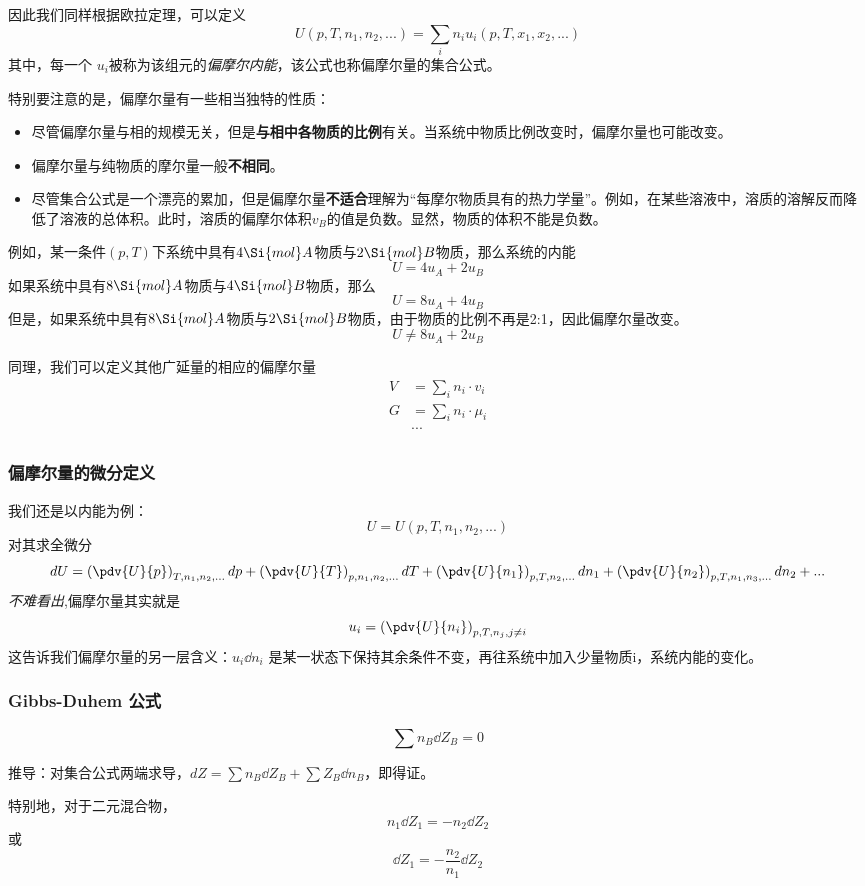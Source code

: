 因此我们同样根据欧拉定理，可以定义
$$ U (p, T, n_1, n_2, ...) = \sum_i n_i u_i(p, T, x_1, x_2, ...) $$
其中，每一个 $u_i$被称为该组元的\textsl{偏摩尔内能}，该公式也称偏摩尔量的集合公式。

特别要注意的是，偏摩尔量有一些相当独特的性质：
\begin{itemize}
\item 尽管偏摩尔量与相的规模无关，但是\textbf{与相中各物质的比例}有关。当系统中物质比例改变时，偏摩尔量也可能改变。
\item 偏摩尔量与纯物质的摩尔量一般\textbf{不相同}。
\item 尽管集合公式是一个漂亮的累加，但是偏摩尔量\textbf{不适合}理解为“每摩尔物质具有的热力学量”。例如，在某些溶液中，溶质的溶解反而降低了溶液的总体积。此时，溶质的偏摩尔体积$v_B$的值是负数。显然，物质的体积不能是负数。
\end{itemize}

\begin{example}{}
例如，某一条件$(p,T)$下系统中具有$4 \Si{mol} A$物质与$2 \Si{mol} B$物质，那么系统的内能
$$U = 4 u_{A} +  2 u_B $$
如果系统中具有$8 \Si{mol} A$物质与$4 \Si{mol} B$物质，那么
$$U = 8 u_A +  4 u_B$$
但是，如果系统中具有$8 \Si{mol} A$物质与$2 \Si{mol} B$物质，由于物质的比例不再是2:1，因此偏摩尔量改变。
$$U \ne 8 u_A +  2 u_B$$
\end{example}

同理，我们可以定义其他广延量的相应的偏摩尔量
$$
\begin{aligned}
V &= \sum_i  n_i \cdot v_i \\
G &= \sum_i  n_i \cdot \mu_i \\
&...\\
\end{aligned}
$$

\subsubsection{偏摩尔量的微分定义}
我们还是以内能为例：
$$U = U (p, T, n_1, n_2, ...)$$
对其求全微分
\begin{equation}\label{eq_ParMol_1}
dU = \left(\pdv{U}{p}\right)_{T,n_1,n_2,...}dp + \left(\pdv{U}{T}\right)_{p,n_1,n_2,...}dT+\left(\pdv{U}{n_1}\right)_{p,T,n_2,...}dn_1+\left(\pdv{U}{n_2}\right)_{p,T,n_1,n_3,...}dn_2+...
\end{equation}
\textsl{不难看出},偏摩尔量其实就是 %
\begin{equation}
{u_i} = \left(\pdv{U}{n_i}\right)_{p,T,n_j, j \neq i} 
\end{equation}
这告诉我们偏摩尔量的另一层含义：$u_i \dd n_i$ 是某一状态下保持其余条件不变，再往系统中加入少量物质i，系统内能的变化。

\subsubsection{Gibbs-Duhem 公式}
\begin{equation}
\sum n_B \dd Z_B = 0
\end{equation}

推导：对集合公式两端求导，$dZ=\sum n_B \dd Z_B + \sum {Z_B}  \dd n_B$，即得证。

特别地，对于二元混合物，
\begin{equation}
n_1 \dd {Z_1} = - n_2 \dd {Z_2}
\end{equation}
或
\begin{equation}
\dd {Z_1} = -\frac{n_2}{n_1} \dd {Z_2}
\end{equation}

